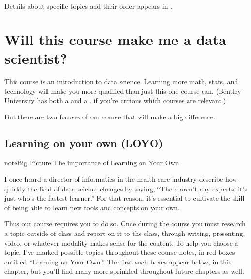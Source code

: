 \documentclass[letterpaper,10pt,english]{jupyterBook}
\begin{document}
\sphinxAtStartPar
Details about specific topics and their order appears in {\hyperref[\detokenize{course-schedule::doc}]{}}.


\section{Will this course make me a data scientist?}
\label{\detokenize{chapter-1-intro-to-data-science:will-this-course-make-me-a-data-scientist}}
\sphinxAtStartPar
This course is an introduction to data science.  Learning more math, stats, and technology will make you more qualified than just this one course can.  (Bentley University has both a  and a , if you’re curious which courses are relevant.)

\sphinxAtStartPar
But there are two focuses of our course that will make a big difference:


\subsection{Learning on your own (LOYO)}
\label{\detokenize{chapter-1-intro-to-data-science:learning-on-your-own-loyo}}
\begin{sphinxadmonition}{note}{Big Picture \sphinxhyphen{} The importance of Learning on Your Own}

\sphinxAtStartPar
I once heard a director of informatics in the health care industry describe how quickly the field of data science changes by saying, “There aren’t any experts; it’s just who’s the fastest learner.”  For that reason, it’s essential to cultivate the skill of being able to learn new tools and concepts on your own.
\end{sphinxadmonition}

\sphinxAtStartPar
Thus our course requires you to do so.  Once during the course you must research a topic outside of class and report on it to the class, through writing, presenting, video, or whatever modality makes sense for the content.  To help you choose a topic, I’ve marked  possible topics throughout these course notes, in red boxes entitled “Learning on Your Own.”  The first such boxes appear below, in this chapter, but you’ll find many more sprinkled throughout future chapters as well.
\end{document}
